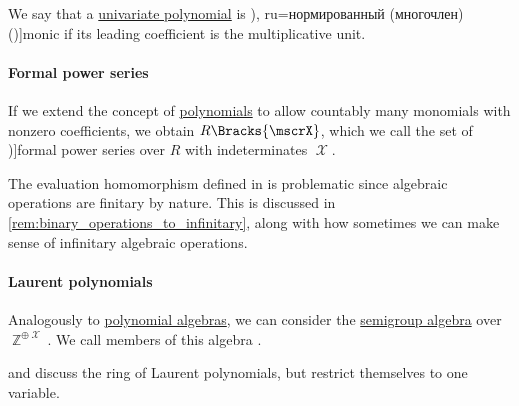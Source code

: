 \begin{definition}\label{def:monic_polynomial}
  We say that a \hyperref[def:univariate_polynomial]{univariate polynomial} is \term[bg=нормированный (многочлен) (\cite[409]{Обрешков1962ВисшаАлгебра}), ru=нормированный (многочлен) (\cite[102]{Винберг2014КурсАлгебры})]{monic} if its leading coefficient is the multiplicative unit.
\end{definition}

\paragraph{Formal power series}

\begin{definition}\label{def:formal_power_series}
  If we extend the concept of \hyperref[def:polynomial_algebra]{polynomials} to allow countably many monomials with nonzero coefficients, we obtain \( R\Bracks{\mscrX} \), which we call the set of \term[ru=формальные степянные ряды (\cite[28]{Шафаревич2019ОсновныеПонятияАлгебры})]{formal power series} over \( R \) with indeterminates \( \mscrX \).
\end{definition}
\begin{comments}
  \item The evaluation homomorphism defined in  is problematic since algebraic operations are finitary by nature. This is discussed in \cref{rem:binary_operations_to_infinitary}, along with how sometimes we can make sense of infinitary algebraic operations.
\end{comments}

\paragraph{Laurent polynomials}

\begin{definition}\label{def:laurent_polynomial_algebra}\mimprovised
  Analogously to \hyperref[def:polynomial_algebra]{polynomial algebras}, we can consider the \hyperref[def:semigroup_algebra]{semigroup algebra} over \( \BbbZ^{\oplus \mscrX} \). We call members of this algebra .
\end{definition}
\begin{comments}
  \item \Textcite[exerc. B-1.7]{Rotman2015AdvancedModernAlgebraPart1} and \textcite[127]{Aluffi2009Algebra} discuss the ring of Laurent polynomials, but restrict themselves to one variable.
\end{comments}


